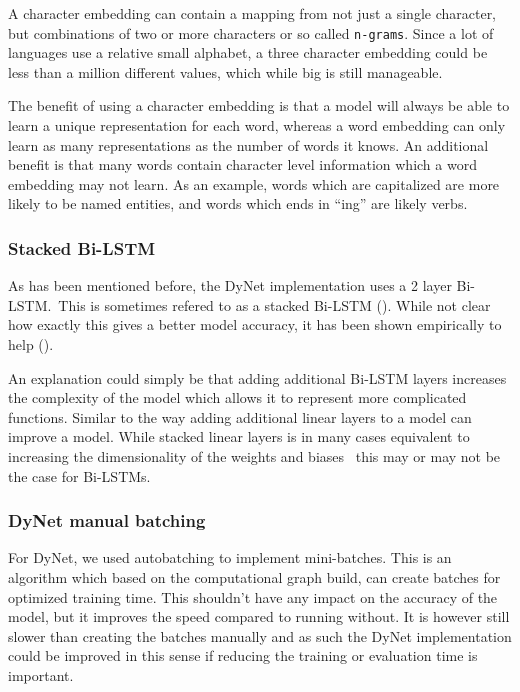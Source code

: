 A character embedding can contain a mapping from not just a single character,
but combinations of two or more characters or so called \texttt{n-grams}. Since
a lot of languages use a relative small alphabet, a three character embedding
could be less than a million different values, which while big is still
manageable.

The benefit of using a character embedding is that a model will always be able
to learn a unique representation for each word, whereas a word embedding can
only learn as many representations as the number of words it knows. An
additional benefit is that many words contain character level information which
a word embedding may not learn. As an example, words which are capitalized are
more likely to be named entities, and words which ends in ``ing'' are likely
verbs.

\subsubsection{Stacked Bi-LSTM}

As has been mentioned before, the DyNet implementation uses a 2 layer Bi-LSTM.\
This is sometimes refered to as a stacked
Bi-LSTM (\cite[Chapter~14.5]{goldberg2017neural}). While not clear how exactly
this gives a better model accuracy, it has been shown empirically to
help (\cite{reimers2017reporting}).

An explanation could simply be that adding additional Bi-LSTM layers increases
the complexity of the model which allows it to represent more complicated
functions. Similar to the way adding additional linear layers to a model can
improve a model. While stacked linear layers is in many cases equivalent to
increasing the dimensionality of the weights and
biases~\cite[pp.~199]{goodfellow2016deep} this may or may not be the case for
Bi-LSTMs.

\subsubsection{DyNet manual batching}

For DyNet, we used autobatching to implement mini-batches. This is an algorithm
which based on the computational graph build, can create batches for optimized
training time. This shouldn't have any impact on the accuracy of the model, but
it improves the speed compared to running without. It is however still slower
than creating the batches manually and as such the DyNet implementation could be
improved in this sense if reducing the training or evaluation time is important.

